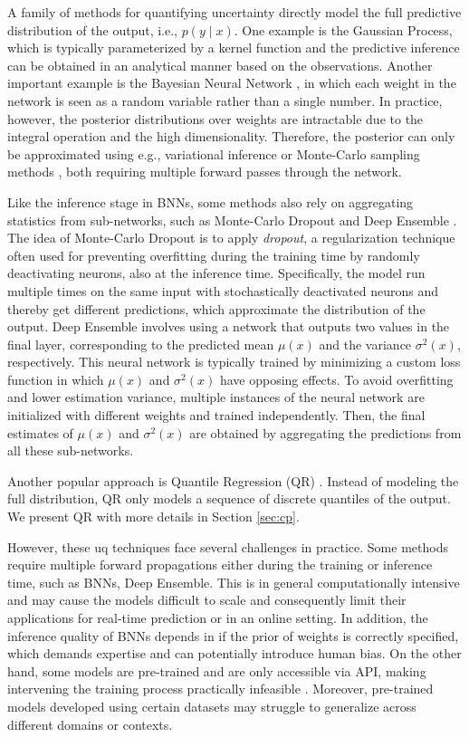 A family of methods for quantifying uncertainty directly model the full predictive distribution of the output, i.e., $p(y \mid x)$. One example is the Gaussian Process, which is typically parameterized by a kernel function and the predictive inference can be obtained in an analytical manner based on the observations. Another important example is the Bayesian Neural Network \cite{kendall2017uncertainties, neal1996bayesian}, in which each weight in the network is seen as a random variable rather than a single number. In practice, however, the posterior distributions over weights are intractable due to the integral operation and the high dimensionality. Therefore, the posterior can only be approximated using e.g.,  variational inference or Monte-Carlo sampling methods \cite{neal1996bayesian, springenberg2016bayesian}, both requiring multiple forward passes through the network. 

Like the inference stage in BNNs, some methods also rely on aggregating statistics from sub-networks, such as Monte-Carlo Dropout \cite{gal2016dropout} and Deep Ensemble \cite{lakshminarayanan2017simple}. The idea of Monte-Carlo Dropout is to apply \textit{dropout}, a regularization technique often used for preventing overfitting during the training time by randomly deactivating neurons, also at the inference time. Specifically, the model run multiple times on the same input with stochastically deactivated neurons and thereby get  different predictions, which approximate the distribution of the output. Deep Ensemble involves using a network that outputs two values in the final layer, corresponding to the predicted mean $\mu(x)$ and the variance $\sigma^2(x)$, respectively. This neural network is typically trained by minimizing a custom loss function in which $\mu(x)$ and $\sigma^2(x)$ have opposing effects. To avoid overfitting and lower estimation variance, multiple instances of the neural network are initialized with different weights and trained independently. Then, the final estimates of $\mu(x)$ and $\sigma^2(x)$ are obtained by aggregating the predictions from all these sub-networks. 

Another popular approach is Quantile Regression (QR) \cite{koenker1978regression}. Instead of modeling the full distribution, QR only models a sequence of discrete quantiles of the output. We present QR with more details in Section \ref{sec:cp}. 

However, these \gls{uq} techniques face several challenges in practice. Some methods require multiple forward propagations either during the training or inference time, such as BNNs, Deep Ensemble. This is in general computationally intensive and may cause the models difficult to scale and consequently limit their applications for real-time prediction or in an online setting. In addition, the inference quality of BNNs depends in if the prior of weights is correctly specified, which demands expertise and can potentially introduce human bias. On the other hand, some models are pre-trained and are only accessible via API, making intervening the training process practically infeasible \cite{mossina2024CVPR}. Moreover, pre-trained models developed using certain datasets may struggle to generalize across different domains or contexts. 

